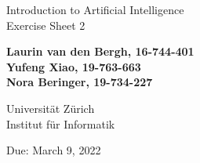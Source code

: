 \documentclass[12pt]{article}
\begin{document}
\begin{titlepage}

\begin{flushleft}

\vspace{2cm}

{\Large Introduction to Artificial Intelligence\\Exercise Sheet 2}\\

\vspace{4cm}

\textbf{Laurin van den Bergh, 16-744-401\\Yufeng Xiao, 19-763-663\\Nora Beringer, 19-734-227}\\

\vspace{2cm}

Universität Zürich\\
Institut für Informatik

\vfill Due: March 9, 2022

\vspace{3cm}


\end{flushleft}
\end{titlepage}

\newpage
\end{document}
